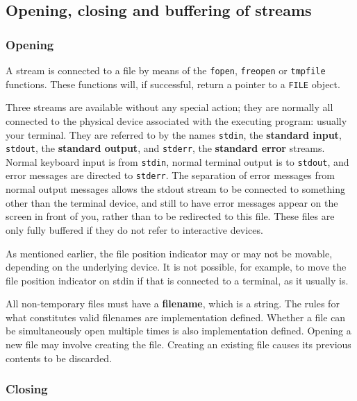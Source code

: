   

  \subsection{Opening, closing and buffering of streams}
   

   \subsubsection{Opening}
    

    A stream is connected to a file by means of the \texttt{fopen},
     \texttt{freopen} or \texttt{tmpfile} functions.  These functions
     will, if successful, return a pointer to a \texttt{FILE} object.


    Three streams are available without any special action; they are
     normally all connected to the physical device associated with the
     executing program: usually your terminal.  They are referred to by the
     names \texttt{stdin}, the \textbf{standard input},
     \texttt{stdout}, the \textbf{standard output}, and
     \texttt{stderr}, the \textbf{standard error} streams.  Normal
     keyboard input is from \texttt{stdin}, normal terminal output is to
     \texttt{stdout}, and error messages are directed to
     \texttt{stderr}.  The separation of error messages from normal output
     messages allows the stdout stream to be connected to something other than
     the terminal device, and still to have error messages appear on the screen
     in front of you, rather than to be redirected to this file.  These files
     are only fully buffered if they do not refer to interactive devices.


    As mentioned earlier, the file position indicator may or may not be
     movable, depending on the underlying device. It is not possible, for
     example, to move the file position indicator on stdin if that is connected
     to a terminal, as it usually is.


    All non-temporary files must have a \textbf{filename}, which is
     a string.  The rules for what constitutes valid filenames are
     implementation defined. Whether a file can be simultaneously open multiple
     times is also implementation defined.  Opening a new file may involve
     creating the file.  Creating an existing file causes its previous contents
     to be discarded.


   

   \subsubsection{Closing}
    


